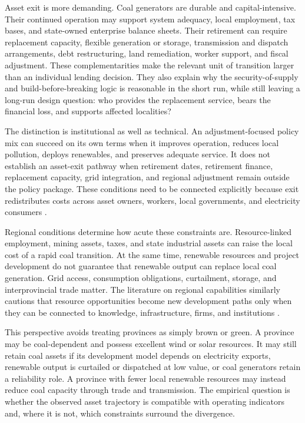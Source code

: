 \documentclass[11pt]{article}
\begin{document}
Asset exit is more demanding. Coal generators are durable and capital-intensive. Their continued operation may support system adequacy, local employment, tax bases, and state-owned enterprise balance sheets. Their retirement can require replacement capacity, flexible generation or storage, transmission and dispatch arrangements, debt restructuring, land remediation, worker support, and fiscal adjustment. These complementarities make the relevant unit of transition larger than an individual lending decision. They also explain why the security-of-supply and build-before-breaking logic is reasonable in the short run, while still leaving a long-run design question: who provides the replacement service, bears the financial loss, and supports affected localities?

The distinction is institutional as well as technical. An adjustment-focused policy mix can succeed on its own terms when it improves operation, reduces local pollution, deploys renewables, and preserves adequate service. It does not establish an asset-exit pathway when retirement dates, retirement finance, replacement capacity, grid integration, and regional adjustment remain outside the policy package. These conditions need to be connected explicitly because exit redistributes costs across asset owners, workers, local governments, and electricity consumers \parencite{newellmulvaney2013}.

Regional conditions determine how acute these constraints are. Resource-linked employment, mining assets, taxes, and state industrial assets can raise the local cost of a rapid coal transition. At the same time, renewable resources and project development do not guarantee that renewable output can replace local coal generation. Grid access, consumption obligations, curtailment, storage, and interprovincial trade matter. The literature on regional capabilities similarly cautions that resource opportunities become new development paths only when they can be connected to knowledge, infrastructure, firms, and institutions \parencite{cohenlevinthal1990,hansencoenen2015,boschma2017}.

This perspective avoids treating provinces as simply brown or green. A province may be coal-dependent and possess excellent wind or solar resources. It may still retain coal assets if its development model depends on electricity exports, renewable output is curtailed or dispatched at low value, or coal generators retain a reliability role. A province with fewer local renewable resources may instead reduce coal capacity through trade and transmission. The empirical question is whether the observed asset trajectory is compatible with operating indicators and, where it is not, which constraints surround the divergence.
\end{document}
